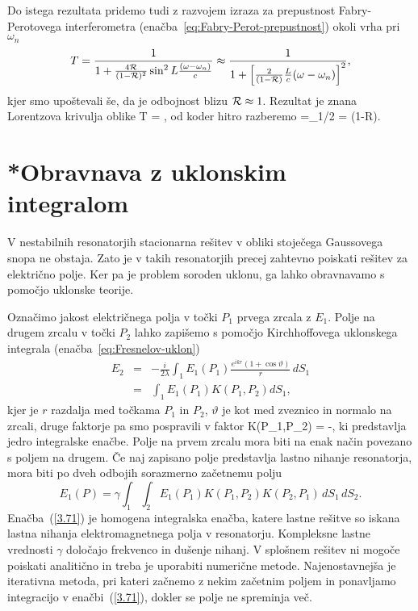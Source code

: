 Do istega rezultata pridemo tudi z razvojem izraza za prepustnost Fabry-Perotovega 
interferometra (enačba~\ref{eq:Fabry-Perot-prepustnost})
okoli vrha pri $\omega_{n}$
\begin{equation}
T=\frac{1}{1+\frac{4{\cal R}}{(1-{\cal R})^{2}}\sin^{2}L\frac{(\omega-\omega_{n})}{c}}\approx 
\frac{1}{1+\left[\frac{2}{(1-{\cal R})}\frac{L}{c}(\omega-\omega_{n})\right]^{2}},
\label{3.27}
\end{equation}
 kjer smo upoštevali še, da je odbojnost blizu ${\cal R} \approx 1$. Rezultat je znana Lorentzova
 krivulja oblike
 \beq
 T = ,
 \eeq
od koder hitro razberemo 
\beq
{}=\Delta\omega_{1/2} = (1-{\cal R}).
\eeq

\section{*Obravnava z uklonskim integralom}
\label{Resonator_uklon}

V nestabilnih resonatorjih stacionarna rešitev v obliki stoječega
Gaussovega snopa ne obstaja. Zato je v takih resonatorjih precej
zahtevno poiskati rešitev za električno polje. 
Ker pa je problem soroden uklonu, ga lahko obravnavamo s pomočjo 
uklonske teorije.

Označimo jakost električnega polja v točki $P_{1}$ prvega zrcala z $E_{1}$.
Polje na drugem zrcalu v točki $P_2$ lahko zapišemo s pomočjo Kirchhoffovega uklonskega
integrala (enačba~\ref{eq:Fresnelov-uklon})
\begin{eqnarray}
E_{2} & = & -\frac{i}{2\lambda}\int_{1}E_{1}(P_{1})\frac{e^{ikr}(1+\cos\vartheta)}{r}\, dS_{1} \\
 & = & \int_{1}E_{1}(P_{1})K(P_{1},P_{2})dS_{1},
\label{eq:resuklon}
\end{eqnarray}
kjer je $r$ razdalja med točkama $P_{1}$ in $P_{2}$, $\vartheta$
je kot med zveznico in normalo na zrcali, druge faktorje pa smo pospravili v faktor
\beq
K(P_{1},P_{2}) = -,
\label{jedro}
\eeq
ki predstavlja jedro integralske enačbe. Polje na prvem zrcalu mora
biti na enak način povezano s poljem na drugem. Če naj zapisano polje predstavlja lastno nihanje
resonatorja, mora biti po dveh odbojih sorazmerno začetnemu polju
\begin{equation}
E_{1}(P)=\gamma\int_{1}\int_{2}E_{1}(P_{1})K(P_{1},P_{2})K(P_{2},P_1)\, dS_{1}\, dS_{2}.
\label{3.71}
\end{equation}
Enačba~(\ref{3.71}) je homogena integralska enačba, katere lastne
rešitve so iskana lastna nihanja elektromagnetnega polja v resonatorju.
Kompleksne lastne vrednosti $\gamma$ določajo frekvenco in dušenje
nihanj. V splošnem rešitev ni mogoče poiskati analitično in treba je uporabiti 
numerične metode. Najenostavnejša je iterativna
metoda, pri kateri začnemo z nekim začetnim poljem in ponavljamo integracijo
v enačbi~(\ref{3.71}), dokler se polje ne spreminja več.

